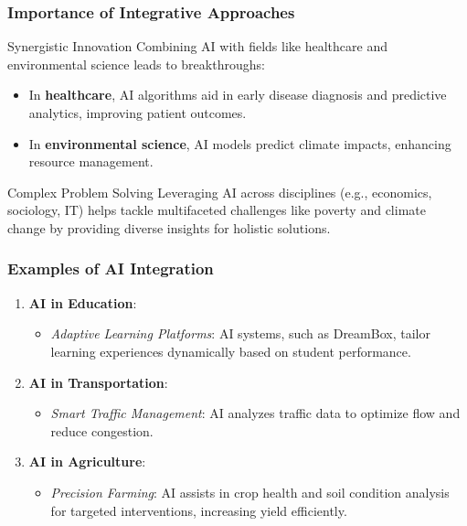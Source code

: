 \documentclass[aspectratio=169]{beamer}
\begin{document}
\begin{frame}[fragile]
    \frametitle{Importance of Integrative Approaches}
    \begin{block}{Synergistic Innovation}
        Combining AI with fields like healthcare and environmental science leads to breakthroughs:
        \begin{itemize}
            \item In \textbf{healthcare}, AI algorithms aid in early disease diagnosis and predictive analytics, improving patient outcomes.
            \item In \textbf{environmental science}, AI models predict climate impacts, enhancing resource management.
        \end{itemize}
    \end{block}

    \begin{block}{Complex Problem Solving}
        Leveraging AI across disciplines (e.g., economics, sociology, IT) helps tackle multifaceted challenges like poverty and climate change by providing diverse insights for holistic solutions.
    \end{block}
\end{frame}

\begin{frame}[fragile]
    \frametitle{Examples of AI Integration}
    \begin{enumerate}
        \item \textbf{AI in Education}:
            \begin{itemize}
                \item \textit{Adaptive Learning Platforms}: AI systems, such as DreamBox, tailor learning experiences dynamically based on student performance.
            \end{itemize}
        \item \textbf{AI in Transportation}:
            \begin{itemize}
                \item \textit{Smart Traffic Management}: AI analyzes traffic data to optimize flow and reduce congestion.
            \end{itemize}
        \item \textbf{AI in Agriculture}:
            \begin{itemize}
                \item \textit{Precision Farming}: AI assists in crop health and soil condition analysis for targeted interventions, increasing yield efficiently.
            \end{itemize}
    \end{enumerate}
\end{frame}
\end{document}
